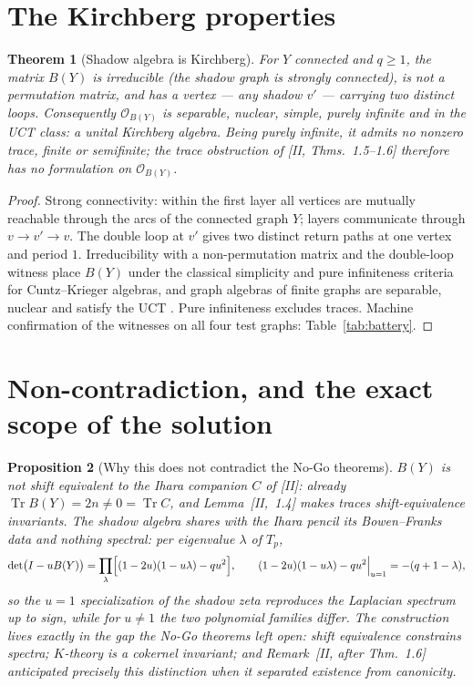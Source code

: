 \documentclass[11pt]{amsart}
\numberwithin{equation}{section}
\newtheorem{theorem}{Theorem}[section]
\newtheorem{proposition}[theorem]{Proposition}
\theoremstyle{definition}
\theoremstyle{remark}
\newcommand{\cO}{\mathcal{O}}
\newcommand{\Tr}{\operatorname{Tr}}
\begin{document}
\section{The Kirchberg properties}\label{sec:kirchberg}

\begin{theorem}[Shadow algebra is Kirchberg]\label{thm:kirchberg}
For $Y$ connected and $q\ge1$, the matrix $B(Y)$ is irreducible (the shadow graph is
strongly connected), is not a permutation matrix, and has a vertex --- any shadow
$v'$ --- carrying two distinct loops. Consequently $\cO_{B(Y)}$ is separable,
nuclear, simple, purely infinite and in the UCT class: a unital Kirchberg algebra.
Being purely infinite, it admits no nonzero trace, finite or semifinite; the trace
obstruction of {\rm[II, Thms.~1.5--1.6]} therefore has no formulation on
$\cO_{B(Y)}$.
\end{theorem}

\begin{proof}
Strong connectivity: within the first layer all vertices are mutually reachable
through the arcs of the connected graph $Y$; layers communicate through
$v\to v'\to v$. The double loop at $v'$ gives two distinct return paths at one
vertex and period $1$. Irreducibility with a non-permutation matrix and the
double-loop witness place $B(Y)$ under the classical simplicity and pure
infiniteness criteria for Cuntz--Krieger algebras, and graph algebras of finite
graphs are separable, nuclear and satisfy the UCT \cite{CK}. Pure infiniteness
excludes traces. Machine confirmation of the witnesses on all four test graphs:
Table~\ref{tab:battery}.
\end{proof}

\section{Non-contradiction, and the exact scope of the solution}\label{sec:scope}

\begin{proposition}[Why this does not contradict the No-Go theorems]\label{prop:noncontra}
$B(Y)$ is not shift equivalent to the Ihara companion $C$ of {\rm[II]}: already
$\Tr B(Y)=2n\neq0=\Tr C$, and Lemma~{\rm[II,~1.4]} makes traces shift-equivalence
invariants. The shadow algebra shares with the Ihara pencil its Bowen--Franks data
and nothing spectral: per eigenvalue $\lambda$ of $T_p$,
\[
\det\bigl(I-uB(Y)\bigr)=\prod_{\lambda}\Bigl[(1-2u)(1-u\lambda)-qu^{2}\Bigr],
\qquad
(1-2u)(1-u\lambda)-qu^{2}\Big|_{u=1}=-(q+1-\lambda),
\]
so the $u=1$ specialization of the shadow zeta reproduces the Laplacian spectrum up
to sign, while for $u\neq1$ the two polynomial families differ. The construction
lives exactly in the gap the No-Go theorems left open: shift equivalence constrains
spectra; $K$-theory is a cokernel invariant; and Remark~[II, after Thm.~1.6]
anticipated precisely this distinction when it separated existence from canonicity.
\end{proposition}
\end{document}
